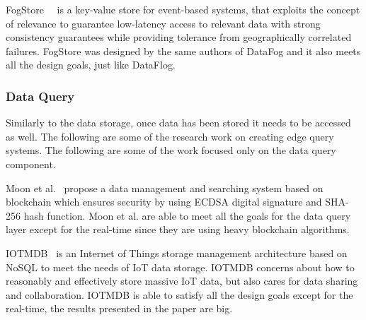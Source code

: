 FogStore~\cite{Gupta:2018}~\cite{Mayer2017FogStore} is a key-value store for event-based systems, that exploits the concept of relevance to guarantee low-latency access to relevant data with strong consistency guarantees while providing tolerance from geographically correlated failures. FogStore was designed by the same authors of DataFog and it also meets all the design goals, just like DataFlog.

\subsubsection{Data Query}

Similarly to the data storage, once data has been stored it needs to be accessed as well. The following are some of the research work on creating edge query systems. The following are some of the work focused only on the data query component.
 
Moon et al.~\cite{8190803} propose a data management and searching system based on blockchain which ensures security by using ECDSA digital signature and SHA-256 hash function. Moon et al. are able to meet all the goals for the data query layer except for the real-time since they are using heavy blockchain algorithms.

IOTMDB~\cite{6468294} is an Internet of Things storage management architecture based on NoSQL to meet the needs of IoT data storage. IOTMDB concerns about how to reasonably and effectively store massive IoT data, but also cares for data sharing and collaboration. IOTMDB is able to satisfy all the design goals except for the real-time, the results presented in the paper are big.


